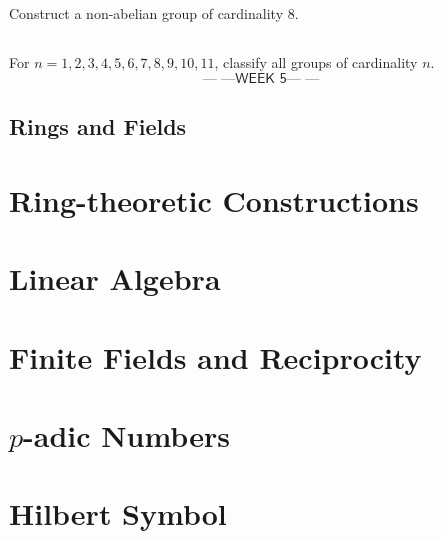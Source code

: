 \documentclass{report}
\newcommand{\week}[1]{$$\textsf{--- ---WEEK #1--- ---}$$}
\begin{document}
\section{}
Construct a non-abelian group of cardinality $8$.
\section{}
For $n = 1,2,3,4,5,6,7,8,9,10,11$, classify all groups of cardinality $n$.
\newpage
\week{5}
\section*{Rings and Fields}

\chapter{Ring-theoretic Constructions}
\chapter{Linear Algebra}
\chapter{Finite Fields and Reciprocity}
\chapter{$p$-adic Numbers}
\chapter{Hilbert Symbol}
\end{document}
